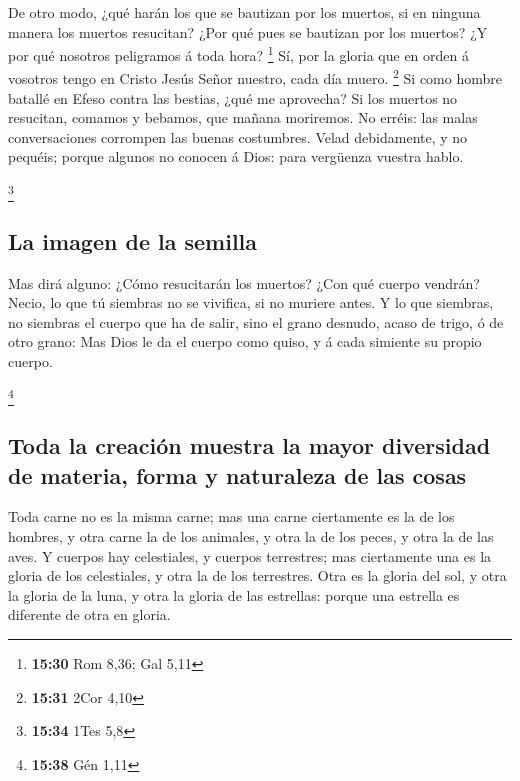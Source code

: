  De otro modo, ¿qué harán los que se bautizan por los
muertos, si en ninguna manera los muertos resucitan? ¿Por qué pues se
bautizan por los muertos?  ¿Y por qué nosotros peligramos
á toda hora? \footnote{\textbf{15:30} Rom 8,36; Gal 5,11}
 Sí, por la gloria que en orden á vosotros tengo en
Cristo Jesús Señor nuestro, cada día muero. \footnote{\textbf{15:31}
  2Cor 4,10}  Si como hombre batallé en Efeso contra las
bestias, ¿qué me aprovecha? Si los muertos no resucitan, comamos y
bebamos, que mañana moriremos.  No erréis: las malas
conversaciones corrompen las buenas costumbres.  Velad
debidamente, y no pequéis; porque algunos no conocen á Dios: para
vergüenza vuestra hablo.

\footnote{\textbf{15:34} 1Tes 5,8}

\hypertarget{la-imagen-de-la-semilla}{%
\subsection{La imagen de la semilla}\label{la-imagen-de-la-semilla}}

 Mas dirá alguno: ¿Cómo resucitarán los muertos? ¿Con qué
cuerpo vendrán?  Necio, lo que tú siembras no se
vivifica, si no muriere antes.  Y lo que siembras, no
siembras el cuerpo que ha de salir, sino el grano desnudo, acaso de
trigo, ó de otro grano:  Mas Dios le da el cuerpo como
quiso, y á cada simiente su propio cuerpo.

\footnote{\textbf{15:38} Gén 1,11}

\hypertarget{toda-la-creaciuxf3n-muestra-la-mayor-diversidad-de-materia-forma-y-naturaleza-de-las-cosas}{%
\subsection{Toda la creación muestra la mayor diversidad de materia,
forma y naturaleza de las
cosas}\label{toda-la-creaciuxf3n-muestra-la-mayor-diversidad-de-materia-forma-y-naturaleza-de-las-cosas}}

 Toda carne no es la misma carne; mas una carne
ciertamente es la de los hombres, y otra carne la de los animales, y
otra la de los peces, y otra la de las aves.  Y cuerpos
hay celestiales, y cuerpos terrestres; mas ciertamente una es la gloria
de los celestiales, y otra la de los terrestres.  Otra es
la gloria del sol, y otra la gloria de la luna, y otra la gloria de las
estrellas: porque una estrella es diferente de otra en gloria.

